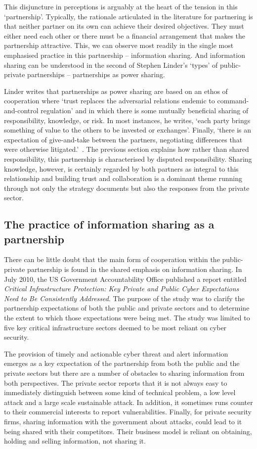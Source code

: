 \documentclass[a4paper,11pt]{article}
\begin{document}
This disjuncture in perceptions is arguably at the heart of the
tension in this `partnership'. Typically, the rationale articulated in
the literature for partnering is that neither partner on its own can
achieve their desired objectives. They must either need each other or
there must be a financial arrangement that makes the partnership
attractive. This, we can observe most readily in the single most
emphasised practice in this partnership -- information sharing. And
information sharing can be understood in the second of Stephen
Linder's `types' of public-private partnerships -- partnerships as
power sharing.

Linder writes that partnerships as power sharing are based on an ethos
of cooperation where `trust replaces the adversarial relations endemic
to command-and-control regulation' and in which there is some mutually
beneficial sharing of responsibility, knowledge, or risk. In most
instances, he writes, `each party brings something of value to the
others to be invested or exchanges'. Finally, `there is an expectation
of give-and-take between the partners, negotiating differences that
were otherwise litigated.'~\cite{linder:1999}.  The previous section
explains how rather than shared responsibility, this partnership is
characterised by disputed responsibility. Sharing knowledge, however,
is certainly regarded by both partners as integral to this
relationship and building trust and collaboration is a dominant theme
running through not only the strategy documents but also the responses
from the private sector.

\subsection{The practice of information sharing as a partnership}

There can be little doubt that the main form of cooperation within the
public-private partnership is found in the shared emphasis on
information sharing. In July 2010, the US Government Accountability
Office published a report entitled {\emph{Critical Infrastructure Protection:
Key Private and Public Cyber Expectations Need to Be Consistently
Addressed}}.  The purpose of the study was to clarify the partnership
expectations of both the public and private sectors and to determine
the extent to which those expectations were being met. The study was
limited to five key critical infrastructure sectors deemed to be most
reliant on cyber security.

The provision of timely and actionable cyber threat and alert
information emerges as a key expectation of the partnership from both
the public and the private sectors but there are a number of obstacles
to sharing information from both perspectives.  The private sector
reports that it is not always easy to immediately distinguish between
some kind of technical problem, a low level attack and a large scale
sustainable attack.  In addition, it sometimes runs counter to their
commercial interests to report vulnerabilities. Finally, for private
security firms, sharing information with the government about attacks,
could lead to it being shared with their competitors. Their business
model is reliant on obtaining, holding and selling information, not
sharing it.
\end{document}
